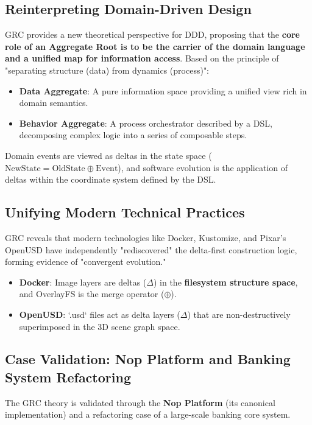 \documentclass[11pt]{article}
\begin{document}
\subsection{Reinterpreting Domain-Driven Design}
GRC provides a new theoretical perspective for DDD, proposing that the \textbf{core role of an Aggregate Root is to be the carrier of the domain language and a unified map for information access}. Based on the principle of "separating structure (data) from dynamics (process)":
\begin{itemize}
    \item \textbf{Data Aggregate}: A pure information space providing a unified view rich in domain semantics.
    \item \textbf{Behavior Aggregate}: A process orchestrator described by a DSL, decomposing complex logic into a series of composable steps.
\end{itemize}
Domain events are viewed as deltas in the state space ($\text{NewState} = \text{OldState} \oplus \text{Event}$), and software evolution is the application of deltas within the coordinate system defined by the DSL.

\subsection{Unifying Modern Technical Practices}
GRC reveals that modern technologies like Docker, Kustomize, and Pixar's OpenUSD have independently "rediscovered" the delta-first construction logic, forming evidence of "convergent evolution."
\begin{itemize}
    \item \textbf{Docker}: Image layers are deltas ($\Delta$) in the \textbf{filesystem structure space}, and OverlayFS is the merge operator ($\oplus$).
    \item \textbf{OpenUSD}: `.usd` files act as delta layers ($\Delta$) that are non-destructively superimposed in the 3D scene graph space.
\end{itemize}

\subsection{Case Validation: Nop Platform and Banking System Refactoring}
The GRC theory is validated through the \textbf{Nop Platform} (its canonical implementation) and a refactoring case of a large-scale banking core system.
\end{document}
